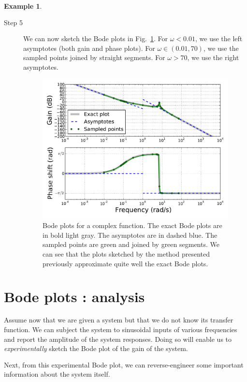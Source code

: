 \documentclass[a4paper,11pt]{report}
\theoremstyle{definition}
\newtheorem{mdexample}{Example}
\newenvironment{example}%
  {\vspace{0.1cm}\begin{mdframed}[backgroundcolor=lightgray]\begin{mdexample}}%
  {\end{mdexample}\end{mdframed}\vspace{0.1cm}}
\begin{document}
\begin{example}
\begin{description}
  \item[Step 5] We can now sketch the Bode plots in
    Fig.~\ref{fig:bode-complex}. For $\omega<0.01$, we use the left
    asymptotes (both gain and phase plots). For $\omega\in(0.01,70)$,
    we use the sampled points joined by straight segments. For
    $\omega>70$, we use the right asymptotes.

  \begin{figure}[H]
    \centering
    \includegraphics[width=12cm]{fig/bode-complex.pdf}
    \caption{Bode plots for a complex function. The exact Bode plots
      are in bold light gray. The asymptotes are in dashed blue. The
      sampled points are green and joined by green segments. We can
      see that the plots sketched by the method presented previously
      approximate quite well the exact Bode plots.}
    \label{fig:bode-complex}
  \end{figure}
  \end{description}
\end{example}

\section{Bode plots : analysis}
\label{sec:bode-analysis}

Assume now that we are given a system but that we do not know its
transfer function. We can subject the system to sinusoidal inputs of
various frequencies and report the amplitude of the system
responses. Doing so will enable us to \emph{experimentally} sketch the
Bode plot of the gain of the system.

Next, from this experimental Bode plot, we can reverse-engineer some
important information about the system itself.
\end{document}
